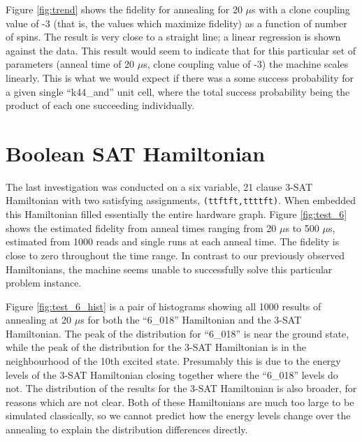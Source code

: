 Figure \ref{fig:trend} shows the fidelity for annealing for 20 $\mu$s with a clone coupling value of -3 (that is, the values which maximize fidelity) as a function of number of spins.  The result is very close to a straight line; a linear regression is shown against the data.  This result would seem to indicate that for this particular set of parameters (anneal time of 20 $\mu$s, clone coupling value of -3) the \machine machine scales linearly.  This is what we would expect if there was a some success probability for a given single ``k44\_and'' unit cell, where the total success probability being the product of each one succeeding individually.

\section{Boolean SAT Hamiltonian}
The last investigation was conducted on a six variable, 21 clause 3-SAT Hamiltonian with two satisfying assignments, \texttt{(ttftft,ttttft)}.  When embedded this Hamiltonian filled essentially the entire hardware graph.  Figure \ref{fig:test_6} shows the estimated fidelity from anneal times ranging from 20 $\mu$s to 500 $\mu$s, estimated from 1000 reads and single runs at each anneal time.  The fidelity is close to zero throughout the time range.  In contrast to our previously observed Hamiltonians, the \machine machine seems unable to successfully solve this particular problem instance.

Figure \ref{fig:test_6_hist} is a pair of histograms showing all 1000 results of annealing at 20 $\mu$s for both the ``6\_018'' Hamiltonian and the 3-SAT Hamiltonian.  The peak of the distribution for ``6\_018'' is near the ground state, while the peak of the distribution for the 3-SAT Hamiltonian is in the neighbourhood of the 10th excited state.  Presumably this is due to the energy levels of the 3-SAT Hamiltonian closing together where the ``6\_018'' levels do not.  The distribution of the results for the 3-SAT Hamiltonian is also broader, for reasons which are not clear.  Both of these Hamiltonians are much too large to be simulated classically, so we cannot predict how the energy levels change over the annealing to explain the distribution differences directly.

